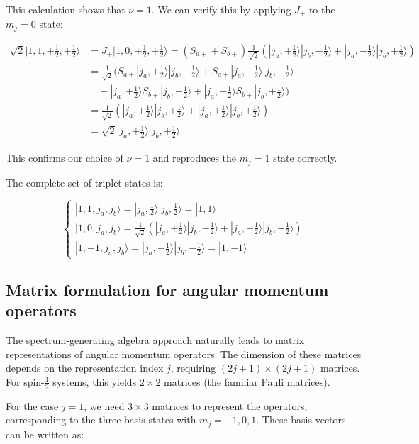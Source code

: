 \documentclass[italian]{HKNdocument}
\begin{document}
This calculation shows that $\nu=1$. We can verify this by applying $J_+$ to the $m_j=0$ state:

\begin{align}
\sqrt{2}|1,1,+\frac{1}{2},+\frac{1}{2}\rangle &= J_{+}|1,0,+\frac{1}{2},+\frac{1}{2}\rangle=(S_{a+}+S_{b+})\frac{1}{\sqrt{2}}(|j_a,+\frac{1}{2}\rangle|j_b,-\frac{1}{2}\rangle+|j_a,-\frac{1}{2}\rangle|j_b,+\frac{1}{2}\rangle) \\
&= \frac{1}{\sqrt{2}}(S_{a+}|j_a,+\frac{1}{2}\rangle|j_b,-\frac{1}{2}\rangle+S_{a+}|j_a,-\frac{1}{2}\rangle|j_b,+\frac{1}{2}\rangle \\
&\quad +|j_a,+\frac{1}{2}\rangle S_{b+}|j_b,-\frac{1}{2}\rangle+|j_a,-\frac{1}{2}\rangle S_{b+}|j_b,+\frac{1}{2}\rangle) \\
&= \frac{1}{\sqrt{2}}(|j_a,+\frac{1}{2}\rangle|j_b,+\frac{1}{2}\rangle+|j_a,+\frac{1}{2}\rangle|j_b,+\frac{1}{2}\rangle) \\
&= \sqrt{2}|j_a,+\frac{1}{2}\rangle|j_b,+\frac{1}{2}\rangle \label{eq:11.67}
\end{align}

This confirms our choice of $\nu=1$ and reproduces the $m_j=1$ state correctly.

The complete set of triplet states is:

\[
\left\{\begin{array}{l}
|1,1,j_a,j_b\rangle=|j_a,\frac{1}{2}\rangle|j_b,\frac{1}{2}\rangle=|1,1\rangle  \label{eq:11.68}\\
|1,0,j_a,j_b\rangle=\frac{1}{\sqrt{2}}(|j_a,+\frac{1}{2}\rangle|j_b,-\frac{1}{2}\rangle+|j_a,-\frac{1}{2}\rangle|j_b,+\frac{1}{2}\rangle) \\
|1,-1,j_a,j_b\rangle=|j_a,-\frac{1}{2}\rangle|j_b,-\frac{1}{2}\rangle=|1,-1\rangle
\end{array}\right.
\]


\subsection{Matrix formulation for angular momentum operators}
The spectrum-generating algebra approach naturally leads to matrix representations of angular momentum operators. The dimension of these matrices depends on the representation index $j$, requiring $(2j+1)\times(2j+1)$ matrices. For spin-$\frac{1}{2}$ systems, this yields $2\times2$ matrices (the familiar Pauli matrices).

For the case $j=1$, we need $3\times3$ matrices to represent the operators, corresponding to the three basis states with $m_j=-1,0,1$. These basis vectors can be written as:
\end{document}
